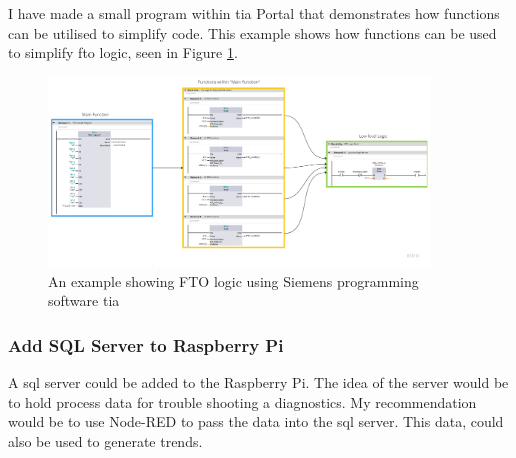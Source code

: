             I have made a small program within \acrshort{tia} Portal that demonstrates how functions can be utilised to simplify code. This example shows how functions can be used to simplify \acrshort{fto} logic, seen in Figure \ref{fig:ftoFunTia}.
    
            \begin{figure}[H]
                \centering
                \includegraphics[width = 0.9\textwidth]{2_images/ftoFunTia}
                \caption{An example showing FTO logic using Siemens programming software \acrfull{tia}}
                \label{fig:ftoFunTia}
            \end{figure}
    
        \subsubsection{Add SQL Server to Raspberry Pi}
            A \acrshort{sql} server could be added to the Raspberry Pi. The idea of the server would be to hold process data for trouble shooting a diagnostics. My recommendation would be to use Node-RED to pass the data into the \acrshort{sql} server. This data, could also be used to generate trends. 

